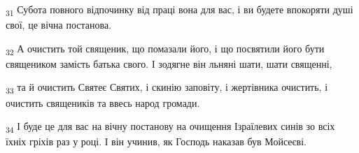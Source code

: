 \begin{tcolorbox}
\textsubscript{31} Субота повного відпочинку від праці вона для вас, і ви будете впокоряти душі свої, це вічна постанова.
\end{tcolorbox}
\begin{tcolorbox}
\textsubscript{32} А очистить той священик, що помазали його, і що посвятили його бути священиком замість батька свого. І зодягне він льняні шати, шати священні,
\end{tcolorbox}
\begin{tcolorbox}
\textsubscript{33} та й очистить Святеє Святих, і скинію заповіту, і жертівника очистить, і очистить священиків та ввесь народ громади.
\end{tcolorbox}
\begin{tcolorbox}
\textsubscript{34} І буде це для вас на вічну постанову на очищення Ізраїлевих синів зо всіх їхніх гріхів раз у році. І він учинив, як Господь наказав був Мойсеєві.
\end{tcolorbox}
